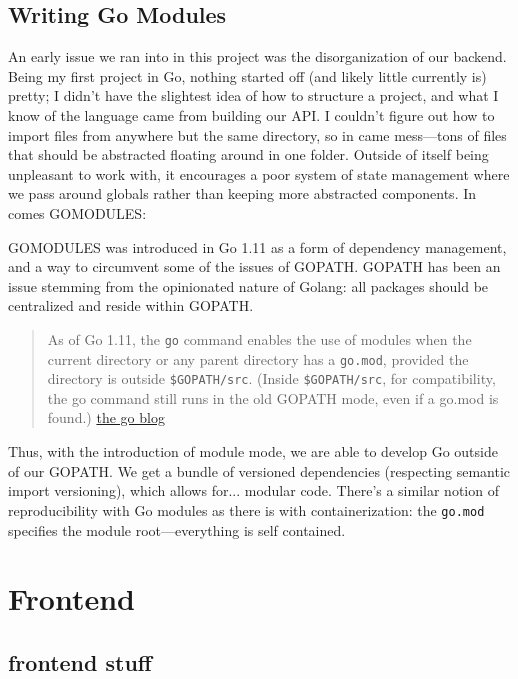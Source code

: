 \documentclass[11pt, twoside, reqno]{book}
\begin{document}
\section{Writing Go Modules}

An early issue we ran into in this project was the disorganization of our backend. Being my first project in Go, nothing started off (and likely little currently is) pretty; I didn't have the slightest idea of how to structure a project, and what I know of the language came from building our API. I couldn't figure out how to import files from anywhere but the same directory, so in came mess—tons of files that should be abstracted floating around in one folder. Outside of itself being unpleasant to work with, it encourages a poor system of state management where we pass around globals rather than keeping more abstracted components. In comes GOMODULES:

GOMODULES was introduced in Go 1.11 as a form of dependency management, and a way to circumvent some of the issues of GOPATH. GOPATH has been an issue stemming from the opinionated nature of Golang: all packages should be centralized and reside within GOPATH.

\begin{quote}
As of Go 1.11, the \texttt{go} command enables the use of modules when the current directory or any parent directory has a \texttt{go.mod}, provided the directory is outside \texttt{\$GOPATH/src}. (Inside \texttt{\$GOPATH/src}, for compatibility, the go command still runs in the old GOPATH mode, even if a go.mod is found.) \href{https://blog.golang.org/using-go-modules}{the go blog}
\end{quote}

Thus, with the introduction of module mode, we are able to develop Go outside of our GOPATH. We get a bundle of versioned dependencies (respecting semantic import versioning), which allows for... modular code. There's a similar notion of reproducibility with Go modules as there is with containerization: the \texttt{go.mod} specifies the module root—everything is self contained.


\chapter{Frontend}




\section{frontend stuff}
\end{document}
